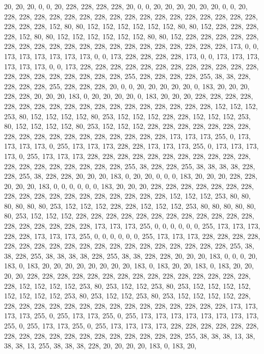 {	20,  20,  20,  0,   0,   20,  228, 228, 228, 228, 20,  0,   0,   20,  20,  20,  20,  20,  20,  0,   0,   20,  228, 228, 228, 228, 228, 228, 228, 228, 228, 228, 228, 228, 228, 228, 228, 228, 228, 228, 228, 228, 152, 80,  80,  152, 152, 152, 152, 152, 152, 80,  80,  152, 228, 228, 228, 228, 152, 80,  80,  152, 152, 152, 152, 152, 152, 80,  80,  152, 228, 228, 228, 228, 228, 228, 228, 228, 228, 228, 228, 228, 228, 228, 228, 228, 228, 228, 228, 228, 173, 0,   0,   173, 173, 173, 173, 173, 173, 0,   0,   173, 228, 228, 228, 228, 173, 0,   0,   173, 173, 173, 173, 173, 173, 0,   0,   173, 228, 228, 228, 228, 228, 228, 228, 228, 228, 228, 228, 228, 228, 228, 228, 228, 228, 228, 228, 228, 255, 228, 228, 228, 228, 255, 38,  38,  228, 228, 228, 228, 255, 228, 228, 228, 20,  0,   0,   20,  20,  20,  
	20,  20,  0,   183, 20,  20,  20,  228, 228, 20,  20,  20,  183, 0,   20,  20,  20,  20,  0,   183, 20,  20,  20,  228, 228, 228, 228, 228, 228, 228, 228, 228, 228, 228, 228, 228, 228, 228, 228, 228, 228, 152, 152, 152, 253, 80,  152, 152, 152, 152, 80,  253, 152, 152, 152, 228, 228, 152, 152, 152, 253, 80,  152, 152, 152, 152, 80,  253, 152, 152, 152, 228, 228, 228, 228, 228, 228, 228, 228, 228, 228, 228, 228, 228, 228, 228, 228, 228, 228, 173, 173, 173, 255, 0,   173, 173, 173, 173, 0,   255, 173, 173, 173, 228, 228, 173, 173, 173, 255, 0,   173, 173, 173, 173, 0,   255, 173, 173, 173, 228, 228, 228, 228, 228, 228, 228, 228, 228, 228, 228, 228, 228, 228, 228, 228, 228, 228, 228, 255, 38,  228, 228, 255, 38,  38,  38,  38,  228, 228, 255, 38,  228, 228, 20,  20,  20,  183, 0,   20,  20,  
	0,   0,   0,   183, 20,  20,  20,  228, 228, 20,  20,  20,  183, 0,   0,   0,   0,   0,   0,   183, 20,  20,  20,  228, 228, 228, 228, 228, 228, 228, 228, 228, 228, 228, 228, 228, 228, 228, 228, 228, 228, 152, 152, 152, 253, 80,  80,  80,  80,  80,  80,  253, 152, 152, 152, 228, 228, 152, 152, 152, 253, 80,  80,  80,  80,  80,  80,  253, 152, 152, 152, 228, 228, 228, 228, 228, 228, 228, 228, 228, 228, 228, 228, 228, 228, 228, 228, 228, 228, 173, 173, 173, 255, 0,   0,   0,   0,   0,   0,   255, 173, 173, 173, 228, 228, 173, 173, 173, 255, 0,   0,   0,   0,   0,   0,   255, 173, 173, 173, 228, 228, 228, 228, 228, 228, 228, 228, 228, 228, 228, 228, 228, 228, 228, 228, 228, 228, 228, 255, 38,  38,  228, 255, 38,  38,  38,  38,  228, 255, 38,  38,  228, 228, 20,  20,  20,  183, 0,   0,   0,   
	20,  183, 0,   183, 20,  20,  20,  20,  20,  20,  20,  20,  183, 0,   183, 20,  20,  183, 0,   183, 20,  20,  20,  20,  228, 228, 228, 228, 228, 228, 228, 228, 228, 228, 228, 228, 228, 228, 228, 228, 152, 152, 152, 152, 253, 80,  253, 152, 152, 253, 80,  253, 152, 152, 152, 152, 152, 152, 152, 152, 253, 80,  253, 152, 152, 253, 80,  253, 152, 152, 152, 152, 228, 228, 228, 228, 228, 228, 228, 228, 228, 228, 228, 228, 228, 228, 228, 228, 173, 173, 173, 173, 255, 0,   255, 173, 173, 255, 0,   255, 173, 173, 173, 173, 173, 173, 173, 173, 255, 0,   255, 173, 173, 255, 0,   255, 173, 173, 173, 173, 228, 228, 228, 228, 228, 228, 228, 228, 228, 228, 228, 228, 228, 228, 228, 228, 228, 228, 255, 38,  38,  38,  13,  38,  38,  38,  13,  255, 38,  38,  38,  228, 20,  20,  20,  20,  183, 0,   183, 20,  
}

